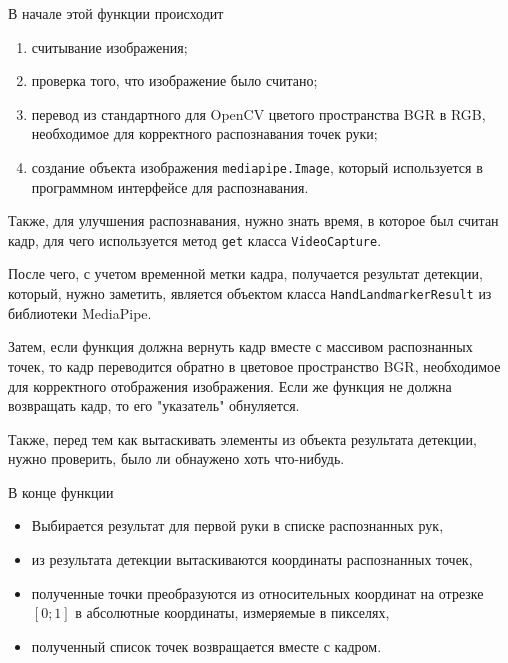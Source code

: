 \documentclass[12pt, a4paper]{article}
\begin{document}
В начале этой функции происходит 
\begin{enumerate}
  \item считывание изображения;
  \item проверка того, что изображение было считано;
  \item перевод из стандартного для OpenCV цветого пространства BGR в RGB,
    необходимое для корректного распознавания точек руки;
  \item создание объекта изображения \texttt{mediapipe.Image}, который
    используется в программном интерфейсе для распознавания.
\end{enumerate}

Также, для улучшения распознавания, нужно знать время, в которое был считан кадр,
для чего используется метод \texttt{get} класса \texttt{VideoCapture}.

После чего, с учетом временной метки кадра, получается результат детекции,
который, нужно заметить, является объектом класса \texttt{HandLandmarkerResult} 
из библиотеки MediaPipe.

Затем, если функция должна вернуть кадр вместе с массивом распознанных точек,
то кадр переводится обратно в цветовое пространство BGR, необходимое для
корректного отображения изображения. Если же функция не должна возвращать
кадр, то его "указатель" обнуляется.

Также, перед тем как вытаскивать элементы из объекта результата детекции,
нужно проверить, было ли обнаужено хоть что-нибудь.

В конце функции 
\begin{itemize}
  \item Выбирается результат для первой руки в списке распознанных рук,
  \item из результата детекции вытаскиваются координаты распознанных точек,
  \item полученные точки преобразуются из относительных координат на отрезке
    $\left[0; 1\right]$ в абсолютные координаты, измеряемые в пикселях,
  \item полученный список точек возвращается вместе с кадром.
\end{itemize}
\end{document}
